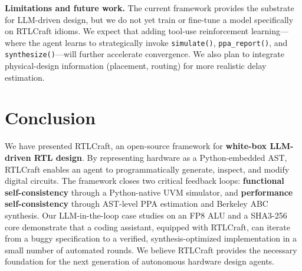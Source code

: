 \documentclass[11pt]{article}
\begin{document}
\textbf{Limitations and future work.} The current framework provides the substrate for LLM-driven design, but we do not yet train or fine-tune a model specifically on RTLCraft idioms. We expect that adding tool-use reinforcement learning---where the agent learns to strategically invoke \texttt{simulate()}, \texttt{ppa\_report()}, and \texttt{synthesize()}---will further accelerate convergence. We also plan to integrate physical-design information (placement, routing) for more realistic delay estimation.

\section{Conclusion}
\label{sec:conclusion}

We have presented RTLCraft, an open-source framework for \textbf{white-box LLM-driven RTL design}. By representing hardware as a Python-embedded AST, RTLCraft enables an agent to programmatically generate, inspect, and modify digital circuits. The framework closes two critical feedback loops: \textbf{functional self-consistency} through a Python-native UVM simulator, and \textbf{performance self-consistency} through AST-level PPA estimation and Berkeley ABC synthesis. Our LLM-in-the-loop case studies on an FP8 ALU and a SHA3-256 core demonstrate that a coding assistant, equipped with RTLCraft, can iterate from a buggy specification to a verified, synthesis-optimized implementation in a small number of automated rounds. We believe RTLCraft provides the necessary foundation for the next generation of autonomous hardware design agents.



\end{document}
